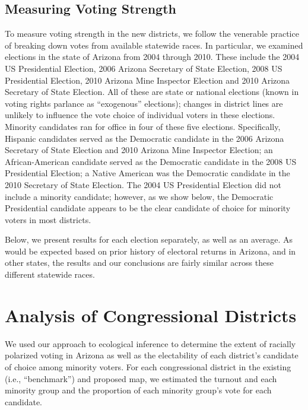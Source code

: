\documentclass[12pt]{scrartcl}
\begin{document}
\subsection{Measuring Voting Strength}

To measure voting strength in the new districts, we follow the
venerable practice of breaking down votes from available statewide
races.  In particular, we examined elections in the state of Arizona
from 2004 through 2010. These include the 2004 US Presidential
Election, 2006 Arizona Secretary of State Election, 2008 US
Presidential Election, 2010 Arizona Mine Inspector Election and 2010
Arizona Secretary of State Election.  All of these are state or
national elections (known in voting rights parlance as ``exogenous''
elections); changes in district lines are unlikely to influence the
vote choice of individual voters in these elections. Minority
candidates ran for office in four of these five elections.
Specifically, Hispanic candidates served as the Democratic candidate
in the 2006 Arizona Secretary of State Election and 2010 Arizona Mine
Inspector Election; an African-American candidate served as the
Democratic candidate in the 2008 US Presidential Election; a Native
American was the Democratic candidate in the 2010 Secretary of State
Election. The 2004 US Presidential Election did not include a minority
candidate; however, as we show below, the Democratic Presidential
candidate appears to be the clear candidate of choice for minority
voters in most districts.  

Below, we present results for each election separately, as well as an
average.  As would be expected based on prior history of electoral
returns in Arizona, and in other states, the results and our
conclusions are fairly similar across these different statewide races.

\section{Analysis of Congressional Districts}

We used our approach to ecological inference to determine the extent
of racially polarized voting in Arizona as well as the electability of
each district's candidate of choice among minority voters. For each
congressional district in the existing (i.e., ``benchmark'') and
proposed map, we estimated the turnout and each minority group and the
proportion of each minority group's vote for each candidate. 
\end{document}

